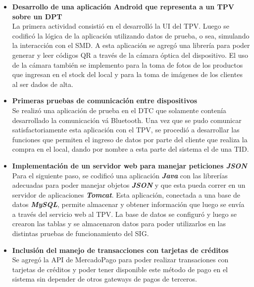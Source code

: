 
\begin{itemize}
	\item \textbf{Desarrollo de una aplicaci\'on Android\Si{\texttrademark} que representa a un \ac{TPV} sobre un \ac{DPT}}\\
	  La primera actividad consisti\'o en el desarroll\'o la \ac{UI} del \ac{TPV}. Luego se codific\'o la l\'ogica de la aplicaci\'on utilizando datos de prueba, o sea, simulando la interacci\'on con el \ac{SMD}. A esta aplicaci\'on se agreg\'o una librer\'ia para poder generar y leer c\'odigos \ac{QR} a trav\'es de la c\'amara \'optica del dispositivo. El uso de la c\'amara tambi\'en se implemento para la toma de fotos de los productos que ingresan en el stock del local y para la toma de im\'agenes de los clientes al ser dados de alta.
	
	\item \textbf{Primeras pruebas de comunicaci\'on entre dispositivos}\\
  	Se realiz\'o una aplicaci\'on de prueba en el \ac{DTC} que solamente conten\'ia desarrollado la comunicaci\'on v\'a Bluetooth\Si{\texttrademark}. Una vez que se pudo comunicar satisfactoriamente esta aplicaci\'on con el \ac{TPV}, se procedi\'o a desarrollar las funciones que permiten el ingreso de datos por parte del cliente que realiza la compra en el local, dando por nombre a esta parte del sistema el de una \ac{TID}.
	
	\item \textbf{Implementaci\'on de un servidor web para manejar peticiones \textbf{\textit{JSON}}}\\
		Para el siguiente paso, se codific\'o una aplicaci\'on \textbf{\textit{Java}} con las librer\'ias adecuadas para poder manejar objetos \textbf{\textit{JSON}} y que esta pueda correr en un servidor de aplicaciones \textbf{\textit{Tomcat}}. Esta aplicaci\'on, conectada a una base de datos \textbf{\textit{MySQL}}, permite almacenar y obtener informaci\'on que luego se env\'ia a trav\'es del servicio web al \ac{TPV}. La base de datos se configur\'o y luego se crearon las tablas y se almacenaron datos para poder utilizarlos en las distintas pruebas de funcionamiento del \ac{SIG}.

	\item \textbf{Inclusi\'on del manejo de transacciones con tarjetas de cr\'editos}\\
		Se agreg\'o la \ac{API} de MercadoPago\Si{\texttrademark} para poder realizar transaciones con tarjetas de cr\'editos y poder tener disponible este m\'etodo de pago en el sistema sin depender de otros gateways de pagos de terceros.


\end{itemize}

